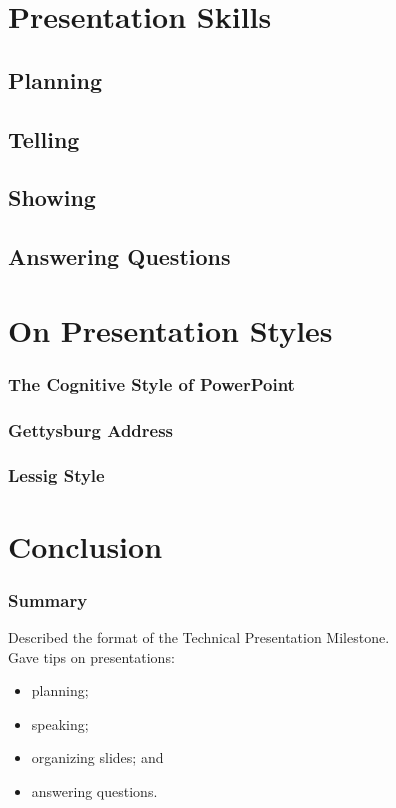 \documentclass{beamer}
\begin{document}
\section{Presentation Skills}

\begin{frame}

\end{frame}

\subsection{Planning}
\subsection{Telling}
\subsection{Showing}
\subsection{Answering Questions}

\section{On Presentation Styles}

\begin{frame}
\frametitle{The Cognitive Style of PowerPoint}

\end{frame}

\begin{frame}
\frametitle{Gettysburg Address}

\end{frame}

\begin{frame}
\frametitle{Lessig Style}
\end{frame}

\section{Conclusion}

\begin{frame}
\frametitle{Summary}

Described the format of the Technical Presentation Milestone.\\[1em]

Gave tips on presentations:

\begin{itemize}
\item planning;
\item speaking;
\item organizing slides; and
\item answering questions.
\end{itemize}


\end{frame}
\end{document}
